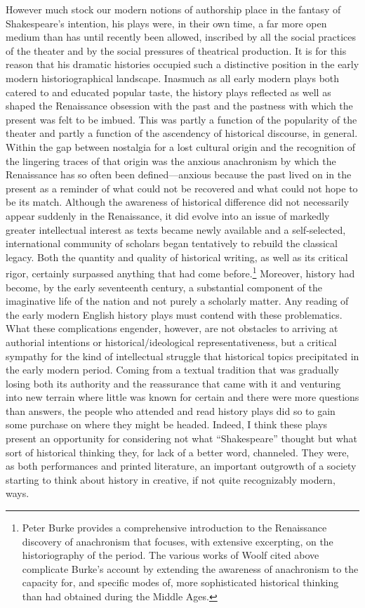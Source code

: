 However much stock our modern notions of authorship place in the fantasy of Shakespeare's intention, his plays were, in their own time, a far more open medium than has until recently been allowed, inscribed by all the social practices of the theater and by the social pressures of theatrical production. It is for this reason that his dramatic histories occupied such a distinctive position in the early modern historiographical landscape. Inasmuch as all early modern plays both catered to and educated popular taste, the history plays reflected as well as shaped the Renaissance obsession with the past and the pastness with which the present was felt to be imbued. This was partly a function of the popularity of the theater and partly a function of the ascendency of historical discourse, in general. Within the gap between nostalgia for a lost cultural origin and the recognition of the lingering traces of that origin was the anxious anachronism by which the Renaissance has so often been defined---anxious because the past lived on in the present as a reminder of what could not be recovered and what could not hope to be its match. Although the awareness of historical difference did not necessarily appear suddenly in the Renaissance, it did evolve into an issue of markedly greater intellectual interest as texts became newly available and a self-selected, international community of scholars began tentatively to rebuild the classical legacy. Both the quantity and quality of historical writing, as well as its critical rigor, certainly surpassed anything that had come before.\footnote{Peter Burke provides a comprehensive introduction to the Renaissance discovery of anachronism that focuses, with extensive excerpting, on the historiography of the period.\nocite{burke_renaissance_1970} The various works of Woolf cited above complicate Burke's account by extending the awareness of anachronism to the capacity for, and specific modes of, more sophisticated historical thinking than had obtained during the Middle Ages.} Moreover, history had become, by the early seventeenth century, a substantial component of the imaginative life of the nation and not purely a scholarly matter. Any reading of the early modern English history plays must contend with these problematics. What these complications engender, however, are not obstacles to arriving at authorial intentions or historical/ideological representativeness, but a critical sympathy for the kind of intellectual struggle that historical topics precipitated in the early modern period. Coming from a textual tradition that was gradually losing both its authority and the reassurance that came with it and venturing into new terrain where little was known for certain and there were more questions than answers, the people who attended and read history plays did so to gain some purchase on where they might be headed. Indeed, I think these plays present an opportunity for considering not what ``Shakespeare'' thought but what sort of historical thinking they, for lack of a better word, channeled. They were, as both performances and printed literature, an important outgrowth of a society starting to think about history in creative, if not quite recognizably modern, ways. 

